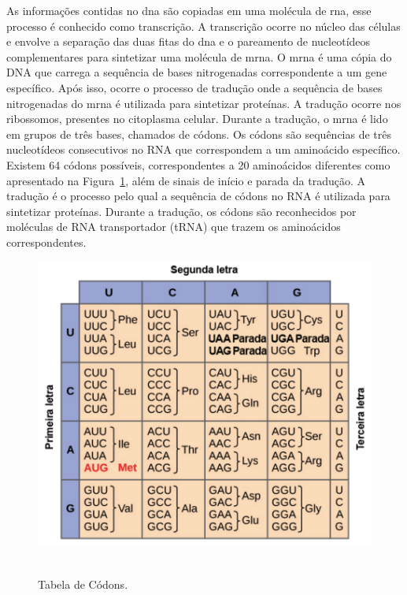 As informações contidas no \gls{dna} são copiadas em uma molécula de \gls{rna}, esse processo é conhecido como transcrição. A transcrição ocorre no núcleo das células e envolve a separação das duas fitas do \gls{dna} e o pareamento de nucleotídeos complementares para sintetizar uma molécula de \gls{mrna}. O \gls{mrna} é uma cópia do DNA que carrega a sequência de bases nitrogenadas correspondente a um gene específico.
Após isso, ocorre o processo de tradução onde a sequência de bases nitrogenadas do \gls{mrna} é utilizada para sintetizar proteínas. A tradução ocorre nos ribossomos, presentes no citoplasma celular. Durante a tradução, o \gls{mrna} é lido em grupos de três bases, chamados de códons. Os códons são sequências de três nucleotídeos consecutivos no RNA que correspondem a um aminoácido específico. Existem 64 códons possíveis, correspondentes a 20 aminoácidos diferentes como apresentado na Figura~\ref{fig:tabelaCodons}, além de sinais de início e parada da tradução. A tradução é o processo pelo qual a sequência de códons no RNA é utilizada para sintetizar proteínas. Durante a tradução, os códons são reconhecidos por moléculas de RNA transportador (tRNA) que trazem os aminoácidos correspondentes.
\begin{figure}[htb]
  \centering
  \caption{Tabela de Códons.}
  \includegraphics[scale=0.6]{figuras/tabelaCodons.pdf}
  ~\label{fig:tabelaCodons}
\end{figure}


